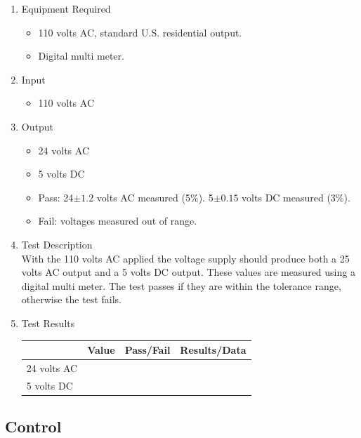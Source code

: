 \documentclass{article}
\begin{document}
\begin{enumerate}
\item Equipment Required
	\begin{itemize}
	\item 110 volts AC, standard U.S. residential output.
	\item Digital multi meter.
	\end{itemize}
\item Input
	\begin{itemize}
	\item 110 volts AC
	\end{itemize}
\item Output
	\begin{itemize}
	\item 24 volts AC
	\item 5 volts DC
	\item Pass: 24$\pm1.2$ volts AC measured (5\%).
		5$\pm0.15$ volts DC measured (3\%).
	\item Fail: voltages measured out of range.
	\end{itemize}
\item Test Description \\

With the 110 volts AC applied the voltage supply should
produce both a 25 volts AC output and a 5 volts DC output.
These values are measured using a digital multi meter.
The test passes if they are within the tolerance range,
otherwise the test fails.

\item Test Results \\
	\vspace{0.2in}
	\begin{tabular}{|l|l|l|l|}
		\hline
		& Value & Pass/Fail & Results/Data\hspace{2in} \\
		\hline
		24 volts AC &&& \\
		\hline
		5 volts DC &&& \\
		\hline
	\end{tabular}
\end{enumerate}

\subsection{Control}
\end{document}
